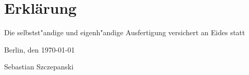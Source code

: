 \newpage
\section*{\vfill{} \thispagestyle{empty}
Erkl\"arung}
Die selbstst"andige und eigenh"andige Ausfertigung versichert an Eides
  statt\\

\bigskip{}

\noindent Berlin, den \today{}
\vspace{2.5cm}

\noindent Sebastian Szczepanski \cleardoublepage{}